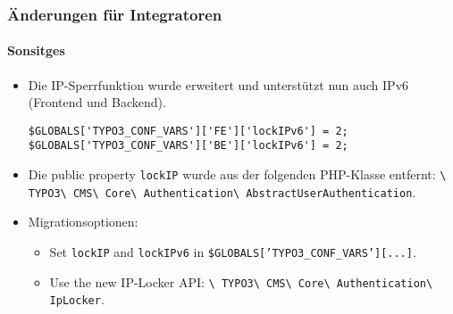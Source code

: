 \begin{frame}[fragile]
	\frametitle{Änderungen für Integratoren}
	\framesubtitle{Sonsitges}

	\lstset{basicstyle=\tiny\ttfamily}

	\begin{itemize}

		\item  Die IP-Sperrfunktion wurde erweitert und unterstützt nun auch IPv6
			(Frontend und Backend).

\begin{lstlisting}
$GLOBALS['TYPO3_CONF_VARS']['FE']['lockIPv6'] = 2;
$GLOBALS['TYPO3_CONF_VARS']['BE']['lockIPv6'] = 2;
\end{lstlisting}

		\item Die public property \texttt{lockIP} wurde aus der folgenden PHP-Klasse entfernt:\newline
			\small
				\texttt{\textbackslash
					TYPO3\textbackslash
					CMS\textbackslash
					Core\textbackslash
					Authentication\textbackslash
					AbstractUserAuthentication}.
			\normalsize

		\item Migrationsoptionen:

			\begin{itemize}\smaller
				\item[\ding{228}] Set \texttt{lockIP} and \texttt{lockIPv6} in \texttt{\$GLOBALS['TYPO3\_CONF\_VARS'][...]}.
				\item[\ding{228}] Use the new IP-Locker API:
					\texttt{\textbackslash
						TYPO3\textbackslash
						CMS\textbackslash
						Core\textbackslash
						Authentication\textbackslash
						IpLocker}.
			\end{itemize}\normalsize


	\end{itemize}

\end{frame}

